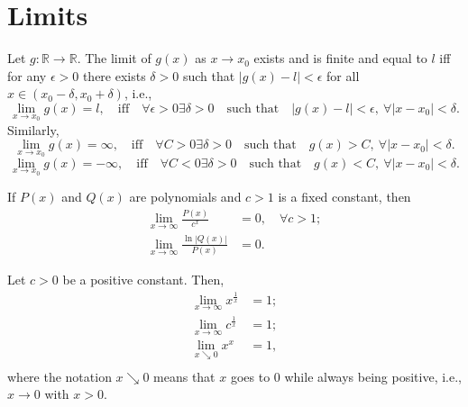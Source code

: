 \section{Limits}
\begin{definition}
    Let $ g : \mathbb{R} \rightarrow \mathbb{R} $.
    The limit of $ g(x) $ as $ x \rightarrow x_0 $ exists and is finite and
        equal to $ l $ iff for any $ \epsilon > 0 $ there exists $ \delta > 0 $
        such that $ |g(x) - l| < \epsilon $ for all $ x \in (x_0 - \delta, x_0 +
        \delta) $, i.e.,
    \begin{equation*}
        \lim_{x \rightarrow x_0} g(x) = l, \quad \text{iff} \quad
            \forall \epsilon > 0 \exists \delta > 0 \quad \text{such that} \quad
            |g(x) - l| < \epsilon,\ \forall |x - x_0| < \delta.
    \end{equation*}
    Similarly,
    \begin{equation*}
        \lim_{x \rightarrow x_0} g(x) = \infty, \quad \text{iff} \quad
            \forall C > 0 \exists \delta > 0 \quad \text{such that} \quad
            g(x) > C,\ \forall |x - x_0| < \delta.
    \end{equation*}
    \begin{equation*}
        \lim_{x \rightarrow x_0} g(x) = -\infty, \quad \text{iff} \quad
            \forall C < 0 \exists \delta > 0 \quad \text{such that} \quad
            g(x) < C,\ \forall |x - x_0| < \delta.
    \end{equation*}
\end{definition}

\begin{theorem}
    If $ P(x) $ and $ Q(x) $ are polynomials and $ c > 1 $ is a fixed constant,
        then
    \begin{align}
        \lim_{x \rightarrow \infty} \frac{P(x)}{c^x} &= 0, \quad
            \forall c > 1; \\
        \lim_{x \rightarrow \infty} \frac{\ln |Q(x)|}{P(x)} &= 0.
    \end{align}
\end{theorem}

\begin{lemma}
    Let $ c > 0 $ be a positive constant.
    Then,
    \begin{align}
        \lim_{x \rightarrow \infty} x^{\frac{1}{x}} &= 1; \\
        \lim_{x \rightarrow \infty} c^{\frac{1}{x}} &= 1; \\
        \lim_{x \searrow 0} x^x &= 1, \\
    \end{align}
    where the notation $ x \searrow 0 $ means that $ x $ goes to 0 while always
        being positive, i.e., $ x \rightarrow 0 $ with $ x > 0 $.
\end{lemma}

